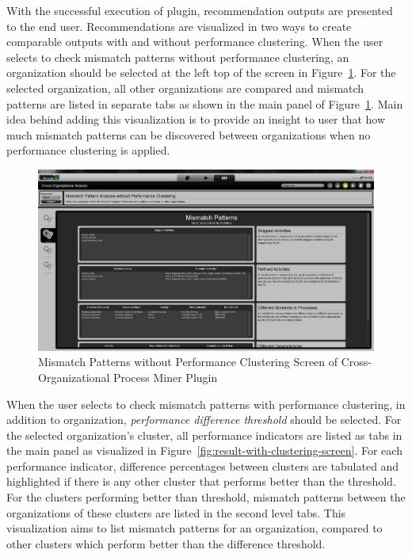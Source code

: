 With the successful execution of plugin, recommendation outputs are presented to the end user. Recommendations are visualized in two ways to create comparable outputs with and without performance clustering. When the user selects to check mismatch patterns without performance clustering, an organization should be selected at the left top of the screen in Figure~\ref{fig:result-without-clustering-screen}. For the selected organization, all other organizations are compared and mismatch patterns are listed in separate tabs as shown in the main panel of Figure~\ref{fig:result-without-clustering-screen}. Main idea behind adding this visualization is to provide an insight to user that how much mismatch patterns can be discovered between organizations when no performance clustering is applied.

\begin{figure}
	\centering
	\includegraphics[width=\textwidth]{4_methodology/result-without-clustering-screen}
	\caption{ Mismatch Patterns without Performance Clustering Screen of Cross-Organizational Process Miner Plugin}
  \label{fig:result-without-clustering-screen}
\end{figure}

When the user selects to check mismatch patterns with performance clustering, in addition to organization, \textit{performance difference threshold} should be selected. For the selected organization's cluster, all performance indicators are listed as tabs in the main panel as visualized in Figure~\ref{fig:result-with-clustering-screen}. For each performance indicator, difference percentages between clusters are tabulated and highlighted if there is any other cluster that performs better than the threshold. For the clusters performing better than threshold, mismatch patterns between the organizations of these clusters are listed in the second level tabs. This visualization aims to list mismatch patterns for an organization, compared to other clusters which perform better than the difference threshold.

